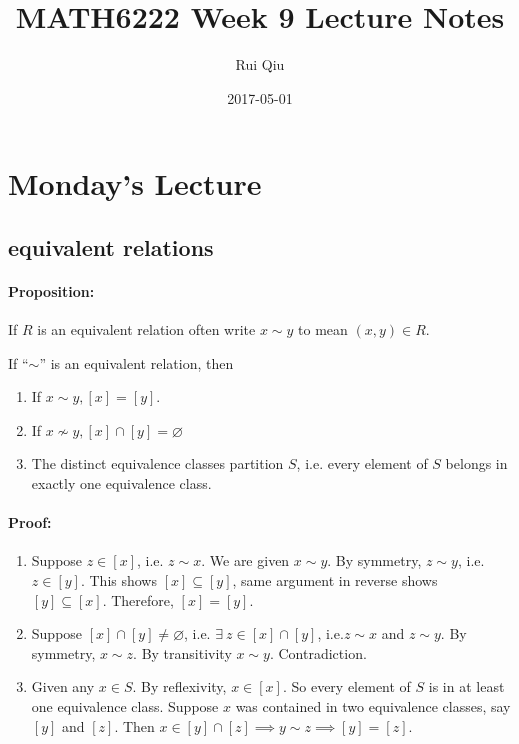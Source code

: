 \documentclass[a4paper, 11pt, twoside]{article}
\begin{document}
\title{MATH6222 Week 9 Lecture Notes}
\author{Rui Qiu}
\date{2017-05-01}

\maketitle

\section{Monday's Lecture}
\subsection{equivalent relations}
\paragraph{Proposition:} If $R$ is an equivalent relation often write $x\sim y$ to mean $(x,y)\in R$.

If ``$\sim$'' is an equivalent relation, then

\begin{enumerate}
	\item If $x\sim y, [x]=[y]$.
	\item If $x\not\sim y, [x]\cap [y] = \varnothing$
	\item The distinct equivalence classes partition $S$, i.e. every element of $S$ belongs in exactly one equivalence class.
\end{enumerate}

\paragraph{Proof:}

\begin{enumerate}
	\item Suppose $z\in[x]$, i.e. $z\sim x$. We are given $x\sim y$. By symmetry, $z\sim y$, i.e. $z\in[y]$. This shows $[x]\subseteq [y]$, same argument in reverse shows $[y]\subseteq [x]$. Therefore, $[x]=[y]$.
	\item Suppose $[x]\cap[y]\not=\varnothing$, i.e. $\exists\ z\in[x]\cap [y]$, i.e.$z\sim x$ and $z\sim y$. By symmetry, $x\sim z$. By transitivity $x\sim y$. Contradiction.
	\item Given any $x\in S$. By reflexivity, $x\in[x]$. So every element of $S$ is in at least one equivalence class. Suppose $x$ was contained in two equivalence classes, say $[y]$ and $[z]$. Then $x\in[y]\cap[z]\implies y\sim z\implies [y]=[z]$.
\end{enumerate}
\end{document}
